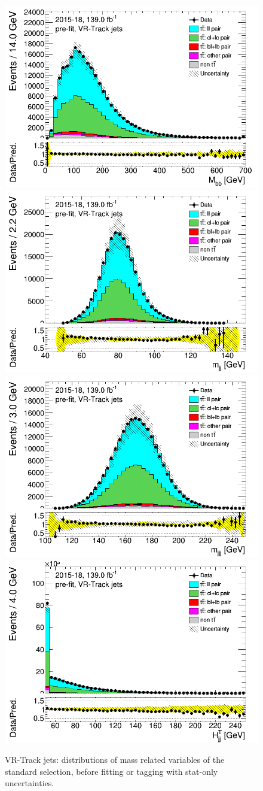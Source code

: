 \documentclass[letterpaper,12pt]{article}
\begin{document}
\newpage
\begin{figure}[H]
\includegraphics[width=.45\textwidth]{FTAG_plots/pretagNoRwwithouthighpTVRJetsall/DataMC_h_Mbbtrackjet.png}
\includegraphics[width=.45\textwidth]{FTAG_plots/pretagNoRwwithouthighpTVRJetsall/DataMC_h_mjjtrackjet.png}\\
\includegraphics[width=.45\textwidth]{FTAG_plots/pretagNoRwwithouthighpTVRJetsall/DataMC_h_mjjjtrackjet.png}
\includegraphics[width=.45\textwidth]{FTAG_plots/pretagNoRwwithouthighpTVRJetsall/DataMC_h_Htjjtrackjet.png}\\
\caption{VR-Track jets: distributions of mass related variables of the standard selection, 
before fitting or tagging with stat-only uncertainties.} \label{fig:standard_mass_VRJets}
\end{figure}
\end{document}
